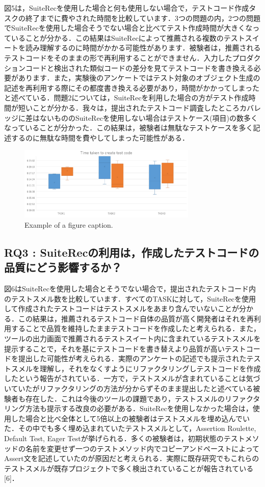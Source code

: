 \documentclass[conference]{IEEEtran}
\begin{document}
図5は，SuiteRecを使用した場合と何も使用しない場合で，テストコード作成タスクの終了までに費やされた時間を比較しています．3つの問題の内，2つの問題でSuiteRecを使用した場合そうでない場合と比べてテスト作成時間が大きくなっていることが分かる．この結果はSuiteRecによって推薦される複数のテストスイートを読み理解するのに時間がかかる可能性があります．被験者は，推薦されるテストコードをそのままの形で再利用することができません．入力したプロダクションコードと検出された類似コードの差分を見てテストコードを書き換える必要があります．また，実験後のアンケートではテスト対象のオブジェクト生成の記述を再利用する際にその都度書き換える必要があり，時間がかかってしまったと述べている．問題2については，SuiteRecを利用した場合の方がテスト作成時間が短いことが分かる．我々は，提出されたテストコード調査したところカバレッジに差はないもののSuiteRecを使用しない場合はテストケース(項目)の数多くなっていることが分かった．この結果は，被験者は無駄なテストケースを多く記述するのに無駄な時間を費やしてしまった可能性がある．
\begin{figure}[htbp]
\centerline{\includegraphics[width=8.5cm]{time.pdf}}
\caption{Example of a figure caption.}
\label{fig}
\end{figure}

\subsection{RQ3 : SuiteRecの利用は，作成したテストコードの品質にどう影響するか？}

図6はSuiteRecを使用した場合とそうでない場合で，提出されたテストコード内のテストスメル数を比較しています．すべてのTASKに対して，SuiteRecを使用して作成されたテストコードはテストスメルをあまり含んでいないことが分かる．この結果は，推薦されるテストコード自体の品質が高く開発者はそれを再利用することで品質を維持したままテストコードを作成したと考えられる．また，ツールの出力画面で推薦されるテストスイート内に含まれているテストスメルを提示することで，それを基にテストコードを書き替えより品質が高いテストコードを提出した可能性が考えられる．実際のアンケートの記述でも提示されたテストスメルを理解し，それをなくすようにリファクタリングしテストコードを作成したという報告がされている．一方で，テストスメルが含まれていることは気づいていたがリファクタリングの方法が分からずそのまま提出したと述べている被験者も存在した．これは今後のツールの課題であり，テストスメルのリファクタリング方法も提示する改良の必要がある．SuiteRecを使用しなかった場合は，使用した場合と比べ全体として5倍以上の被験者はテストスメルを埋め込んでいた．その中でも多く埋め込まれていたテストスメルとして，Assertion Roulette, Default Test, Eager Testが挙げられる．多くの被験者は，初期状態のテストメソッドの名前を変更せず一つのテストメソッド内でコピーアンドペーストによってAssert文を記述していたのが原因だと考えられる．実際に既存研究でもこれらのテストスメルが既存プロジェクトで多く検出されていることが報告されている[6]． 
\end{document}
